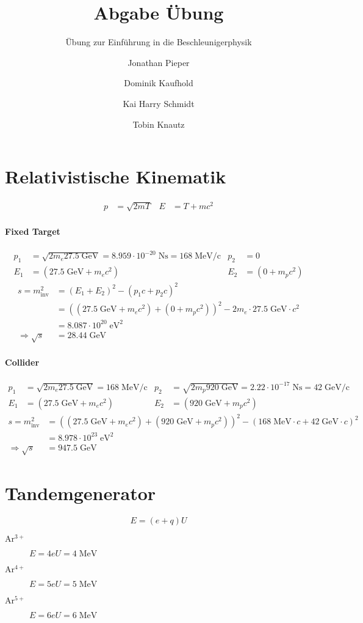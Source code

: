 \documentclass[12pt,DIV=15,a4paper,twoside,draft=false]{scrartcl}
\author{Jonathan Pieper\and Dominik Kaufhold\and Kai Harry Schmidt\and Tobin Knautz}
\title{Abgabe Übung \blatt{}}
\subtitle{Übung zur Einführung in die Beschleunigerphysik}
\newcommand{\blatt}{2}
\begin{document}
\maketitle
\titlelabel{Aufgabe \blatt{}.\thesection{} }

\section{Relativistische Kinematik}
\begin{align*}
p &= \sqrt{2mT} &
E &= T + mc^2
\end{align*}
\paragraph{Fixed Target}
\begin{align*}
p_1 &= \sqrt{2 m_e 27.5\;\mathrm{GeV}} = 
8.959\cdot 10^{-20}\;\mathrm{Ns} = 168\;\mathrm{MeV/c} & 
p_2 &= 0\\
E_1 &= (27.5\;\mathrm{GeV} + m_e c^2) & 
E_2 &= (0 + m_p c^2)
\end{align*}
\begin{align*}
s = m_{\mathrm{inv}}^2 &=
 (E_1 + E_2)^2 - (p_1c + p_2c)^2\\
  &=  ((27.5\;\mathrm{GeV} + m_e c^2) + (0+ m_p c^2))^2 - 2 m_e \cdot 27.5\;\mathrm{GeV} \cdot c^2\\
&= 8.087\cdot 10^{20}\;\mathrm{eV}^2 \\
⇒ \sqrt{s} &= 28.44\;\mathrm{GeV}
\end{align*}
\paragraph{Collider}
\begin{align*}
p_1 &= \sqrt{2 m_e 27.5\;\mathrm{GeV}} = 168\;\mathrm{MeV/c}& 
p_2 &= \sqrt{2 m_p 920\;\mathrm{GeV}} = 2.22\cdot 10^{-17}\;\mathrm{Ns} = 42\;\mathrm{GeV/c}\\
E_1 &= (27.5\;\mathrm{GeV} + m_e c^2) & 
E_2 &= (920\;\mathrm{GeV} + m_p c^2)
\end{align*}
\begin{align*}
s = m_{\mathrm{inv}}^2 &=
 ((27.5\;\mathrm{GeV} + m_e c^2) + (920\;\mathrm{GeV} + m_p c^2))^2 - 
(168\;\mathrm{MeV}\cdot c + 42\;\mathrm{GeV}\cdot c)^2\\
&= 8.978\cdot 10^{23}\;\mathrm{eV}^2\\
⇒ \sqrt{s} &= 947.5 \;\mathrm{GeV}
\end{align*}

\section{Tandemgenerator}
$$ E = (e+q) U $$
\begin{description}
\item[$\mathrm{Ar^{3+}}$] $ E = 4 e U = 4\;\mathrm{MeV}$
\item[$\mathrm{Ar^{4+}}$] $ E = 5 e U = 5\;\mathrm{MeV}$
\item[$\mathrm{Ar^{5+}}$] $ E = 6 e U = 6\;\mathrm{MeV}$
\end{description}
\end{document}
